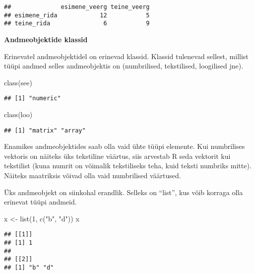 \documentclass[
]{book}
\newenvironment{Shaded}{\begin{snugshade}}{\end{snugshade}}
\newcommand{\DecValTok}[1]{\textcolor[rgb]{0.00,0.00,0.81}{#1}}
\newcommand{\FunctionTok}[1]{\textcolor[rgb]{0.00,0.00,0.00}{#1}}
\newcommand{\NormalTok}[1]{#1}
\newcommand{\OtherTok}[1]{\textcolor[rgb]{0.56,0.35,0.01}{#1}}
\newcommand{\StringTok}[1]{\textcolor[rgb]{0.31,0.60,0.02}{#1}}
\begin{document}
\begin{verbatim}
##              esimene_veerg teine_veerg
## esimene_rida            12           5
## teine_rida               6           9
\end{verbatim}

\textbf{Andmeobjektide klassid}

Erinevatel andmeobjektidel on erinevad klassid. Klassid tulenevad sellest, millist tüüpi andmed selles andmeobjektis on (numbrilised, tekstilised, loogilised jne).

\begin{Shaded}
\begin{Highlighting}[]
\FunctionTok{class}\NormalTok{(see)}
\end{Highlighting}
\end{Shaded}

\begin{verbatim}
## [1] "numeric"
\end{verbatim}

\begin{Shaded}
\begin{Highlighting}[]
\FunctionTok{class}\NormalTok{(loo)}
\end{Highlighting}
\end{Shaded}

\begin{verbatim}
## [1] "matrix" "array"
\end{verbatim}

Enamikes andmeobjektides saab olla vaid ühte tüüpi elemente. Kui numbrilises vektoris on näiteks üks tekstiline väärtus, siis arvestab R seda vektorit kui tekstilist (kuna numrit on võimalik tekstiliseks teha, kuid teksti numbriks mitte). Näiteks maatriksis võivad olla vaid numbrilised väärtused.

Üks andmeobjekt on siinkohal erandlik. Selleks on ``list'', kus võib korraga olla erinevat tüüpi andmeid.

\begin{Shaded}
\begin{Highlighting}[]
\NormalTok{x }\OtherTok{\textless{}{-}} \FunctionTok{list}\NormalTok{(}\DecValTok{1}\NormalTok{, }\FunctionTok{c}\NormalTok{(}\StringTok{"b"}\NormalTok{, }\StringTok{"d"}\NormalTok{))}
\NormalTok{x}
\end{Highlighting}
\end{Shaded}

\begin{verbatim}
## [[1]]
## [1] 1
## 
## [[2]]
## [1] "b" "d"
\end{verbatim}
\end{document}

